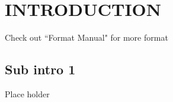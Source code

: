 \chapter{INTRODUCTION}

\fancyhf{}
\fancyfoot[C]{ \thepage}



\label{Introduction}
Check out ``Format Manual" for more format\cite{asu2023}
\section{Sub intro 1}
Place holder